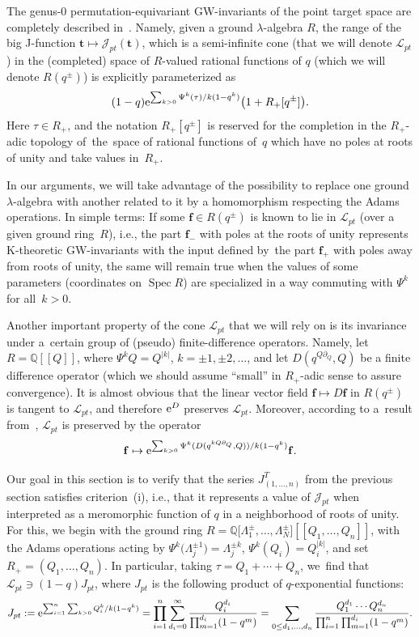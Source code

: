 \documentclass[pdftex]{sigma}
\numberwithin{equation}{section}
\def\J{\mathcal J}
\def\L{\mathcal L}
\def\QQ{\mathbb Q}
\def\p{\partial}
\def\f{{\mathbf f}}
\def\t{{\mathbf t}}
\begin{document}
The genus-$0$ permutation-equivariant GW-invariants of the point target space are completely described in~\cite{Givental:perm3}. Namely, given a ground $\lambda$-algebra $R$, the range of the big J-function
$\t\mapsto \J_{pt}(\t)$, which is a semi-infinite cone (that we will denote $\L_{pt}$) in the (completed) space of $R$-valued rational functions of $q$ (which we will denote $R(q^{\pm})$) is explicitly parameterized as
\[
(1-q) {\rm e}^{ \sum_{k>0}\Psi^k(\tau)/k(1-q^k)}\big(1+R_{+}[q^{\pm}]\big).
\]
Here $\tau\in R_{+}$, and the notation $R_{+}[q^{\pm}]$ is reserved for the completion in the $R_{+}$-adic topology of~the~space of rational functions of~$q$ which have no poles at roots of unity and take values in~$R_{+}$.

In our arguments, we will take advantage of the possibility to replace one ground $\lambda$-algebra with another related to it by a homomorphism respecting the Adams operations. In simple terms: If some
$\f\in R(q^{\pm})$ is known to lie in $\L_{pt}$ (over a given ground ring~$R$), i.e., the part $\f_{-}$ with poles at the roots of unity represents K-theoretic GW-invariants with the input defined by~the part $\f_{+}$ with poles away from roots of unity, the same will remain true when the values of some parameters (coordinates on $\operatorname{Spec} R$) are specialized in a way commuting with $\Psi^k$ for all~$k>0$.

Another important property of the cone $\L_{pt}$ that we will rely on is its invariance under a~cer\-tain group of (pseudo) finite-difference operators. Namely, let $R=\QQ[[Q]]$, where $\Psi^kQ=Q^{|k|}$, $k=\pm 1,\pm 2,\dots$, and let $D(q^{Q\p_Q},Q)$ be a finite difference operator (which we should assume ``small'' in $R_{+}$-adic sense to assure convergence). It is almost obvious that the linear vector field $\f \mapsto D\f$ in $R(q^{\pm})$ is tangent to $\L_{pt}$, and therefore ${\rm e}^D$ preserves $\L_{pt}$. Moreover, according to a~result from~\cite{Givental:perm4}, $\L_{pt}$ is preserved by the operator
\[
\f\mapsto {\rm e}^{ \sum_{k>0} \Psi^k(D(q^{kQ\p_Q},Q))/k(1-q^k)} \f.
\]

Our goal in this section is to verify that the series $J^T_{(1,\dots,n)}$ from the previous section satis\-fies criterion~(i), i.e., that it represents a value of $\J_{pt}$ when interpreted as a meromorphic function of $q$ in a neighborhood of roots of unity. For this, we begin with the ground ring $R=\QQ\big[\Lambda_1^{\pm},\dots,\Lambda_N^{\pm}\big][[Q_1,\dots,Q_n]]$, with the Adams operations acting by $\Psi^k\big(\Lambda_j^{\pm 1}\big)=\Lambda_j^{\pm k}$, $\Psi^k(Q_i)=Q_i^{|k|}$, and set $R_{+}=(Q_1,\dots,Q_n)$. In particular, taking $\tau=Q_1+\cdots+Q_n$, we~find that $\L_{pt}\ni (1-q) J_{pt}$, where $J_{pt}$ is the following product of $q$-exponential functions:
\begin{gather*}
J_{pt}:= {\rm e}^{\sum_{i=1}^n\sum_{k>0}Q_i^k/k(1-q^k)}
= \prod_{i=1}^n \sum_{d_i=0}^{\infty}\frac{Q_i^{d_i}}{\prod_{m=1}^{d_i}(1-q^m)}
 = \sum_{0\leq d_1,\dots,d_n}\frac{Q_1^{d_1}\cdots Q_n^{d_n}}{\prod_{i=1}^n\prod_{m=1}^{d_i}(1-q^m)}.
 \end{gather*}
\end{document}
